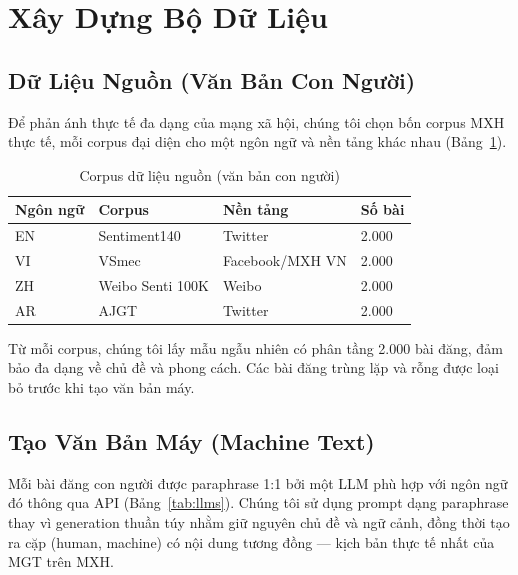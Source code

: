 
\section{Xây Dựng Bộ Dữ Liệu}
\label{sec:dataset}

\subsection{Dữ Liệu Nguồn (Văn Bản Con Người)}

Để phản ánh thực tế đa dạng của mạng xã hội, chúng tôi chọn bốn corpus
MXH thực tế, mỗi corpus đại diện cho một ngôn ngữ và nền tảng khác nhau
(Bảng~\ref{tab:sources}).

\begin{table}[h]
\centering
\caption{Corpus dữ liệu nguồn (văn bản con người)}
\label{tab:sources}
\begin{tabular}{llll}
\toprule
\textbf{Ngôn ngữ} & \textbf{Corpus} & \textbf{Nền tảng} & \textbf{Số bài} \\
\midrule
EN & Sentiment140    & Twitter & 2.000 \\
VI & VSmec           & Facebook/MXH VN & 2.000 \\
ZH & Weibo Senti 100K & Weibo  & 2.000 \\
AR & AJGT            & Twitter & 2.000 \\
\bottomrule
\end{tabular}
\end{table}

Từ mỗi corpus, chúng tôi lấy mẫu ngẫu nhiên có phân tầng 2.000 bài
đăng, đảm bảo đa dạng về chủ đề và phong cách. Các bài đăng trùng lặp
và rỗng được loại bỏ trước khi tạo văn bản máy.

\subsection{Tạo Văn Bản Máy (Machine Text)}

Mỗi bài đăng con người được paraphrase 1:1 bởi một LLM phù hợp với
ngôn ngữ đó thông qua API (Bảng~\ref{tab:llms}). Chúng tôi sử dụng
prompt dạng paraphrase thay vì generation thuần túy nhằm giữ nguyên
chủ đề và ngữ cảnh, đồng thời tạo ra cặp (human, machine) có nội dung
tương đồng --- kịch bản thực tế nhất của MGT trên MXH.

